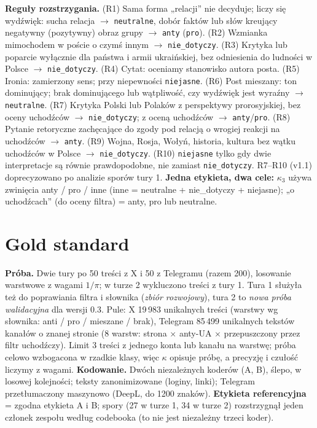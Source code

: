\documentclass[10pt,a4paper]{article}
\begin{document}
\textbf{Reguły rozstrzygania.} (R1) Sama forma „relacji” nie decyduje; liczy się wydźwięk: sucha relacja $\to$ \texttt{neutralne}, dobór faktów lub słów kreujący negatywny (pozytywny) obraz grupy $\to$ \texttt{anty} (\texttt{pro}).
(R2) Wzmianka mimochodem w poście o czymś innym $\to$ \texttt{nie\_dotyczy}.
(R3) Krytyka lub poparcie wyłącznie dla państwa i armii ukraińskiej, bez odniesienia do ludności w Polsce $\to$ \texttt{nie\_dotyczy}.
(R4) Cytat: oceniamy stanowisko autora posta. (R5) Ironia: zamierzony sens; przy niepewności \texttt{niejasne}.
(R6) Post mieszany: ton dominujący; brak dominującego lub wątpliwość, czy wydźwięk jest wyraźny $\to$ \texttt{neutralne}.
(R7) Krytyka Polski lub Polaków z perspektywy prorosyjskiej, bez oceny uchodźców $\to$ \texttt{nie\_dotyczy}; z oceną uchodźców $\to$ \texttt{anty}/\texttt{pro}. (R8) Pytanie retoryczne zachęcające do zgody pod relacją o wrogiej reakcji na uchodźców $\to$ \texttt{anty}. (R9) Wojna, Rosja, Wołyń, historia, kultura bez wątku uchodźców w Polsce $\to$ \texttt{nie\_dotyczy}. (R10) \texttt{niejasne} tylko gdy dwie interpretacje są równie prawdopodobne, nie zamiast \texttt{nie\_dotyczy}. R7--R10 (v1.1) doprecyzowano po analizie sporów tury 1.
\textbf{Jedna etykieta, dwa cele:} $\kappa_3$ używa zwinięcia anty / pro / inne (inne = neutralne + nie\_dotyczy + niejasne); „o uchodźcach” (do oceny filtra) = anty, pro lub neutralne.

\section{Gold standard}
\textbf{Próba.} Dwie tury po 50 treści z X i 50 z Telegramu (razem 200), losowanie warstwowe z wagami $1/\pi$; w turze 2 wykluczono treści z tury 1. Tura 1 służyła też do poprawiania filtra i słownika (\emph{zbiór rozwojowy}), tura 2 to \emph{nowa próba walidacyjna} dla wersji 0.3. Pule: X 19\,983 unikalnych treści (warstwy wg słownika: anti / pro / mieszane / brak), Telegram 85\,499 unikalnych tekstów kanałów o znanej stronie (8 warstw: strona $\times$ anty-UA $\times$ przepuszczony przez filtr uchodźczy). Limit 3 treści z jednego konta lub kanału na warstwę; próba celowo wzbogacona w rzadkie klasy, więc $\kappa$ opisuje próbę, a precyzję i czułość liczymy z wagami.
\textbf{Kodowanie.} Dwóch niezależnych koderów (A, B), ślepo, w losowej kolejności; teksty zanonimizowane (loginy, linki); Telegram przetłumaczony maszynowo (DeepL, do 1200 znaków).
\textbf{Etykieta referencyjna} = zgodna etykieta A i B; spory (27 w turze 1, 34 w turze 2) rozstrzygnął jeden członek zespołu według codebooka (to nie jest niezależny trzeci koder).
\end{document}
